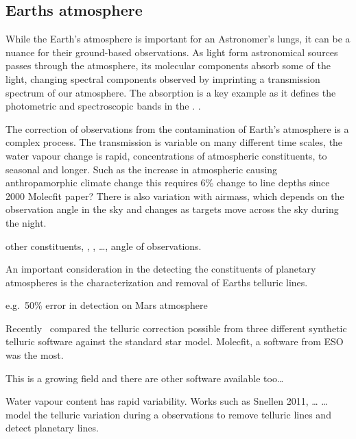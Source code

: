 \subsection{Earths atmosphere}
While the Earth's atmosphere is important for an Astronomer's lungs, it can be a nuance for their ground-based observations. As light form astronomical sources passes through the atmosphere, its molecular components absorb some of the light, changing spectral components observed by imprinting a transmission spectrum of our atmosphere. The  absorption is a key example as it defines the photometric and spectroscopic bands in the \nir{}. .

The correction of observations from the contamination of Earth's atmosphere is a complex process. The transmission is variable on many different time scales, the water vapour change is rapid, concentrations of atmospheric constituents, to seasonal and longer. Such as the increase in atmospheric  causing anthropamorphic climate change this requires 6\% change to  line depths since 2000 Molecfit paper? There is also variation with airmass, which depends on the observation angle in the sky and changes as targets move across the sky during the night.

other constituents, , ,  \ldots{}, angle of observations.

An important consideration in the detecting the constituents of planetary atmospheres is the characterization and removal of Earths telluric lines.

e.g.\ 50\% error in  detection on Mars atmosphere


Recently~\citet{ulmer-moll_telluric_2018} compared the telluric correction possible from three different synthetic telluric software against the standard star model. Molecfit, a software from ESO was the most.

This is a growing field and there are other software available too\ldots{}


Water vapour content has rapid variability. Works such as Snellen 2011, \ldots{} \ldots{}  model the telluric variation during a observations to remove telluric lines and detect planetary lines.



